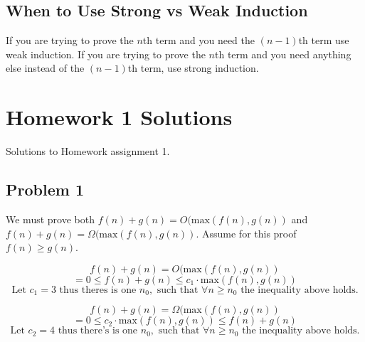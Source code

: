 \documentclass{article}
\begin{document}
\subsection{When to Use Strong vs Weak Induction}

If you are trying to prove the $n$th term and you need the $(n-1)$th term use weak induction. If you are trying to prove the $n$th term and you need anything else instead of the $(n-1)$th term, use strong induction.

\section{Homework 1 Solutions}

Solutions to Homework assignment 1.

\subsection{Problem 1}

We must prove both $f(n) + g(n) = O(\text{max}(f(n),g(n))$ and $f(n) + g(n) = \Omega(\text{max}(f(n),g(n))$. Assume for this proof $f(n) \ge g(n)$.

$$f(n) + g(n) = O(\text{max}(f(n),g(n))$$
$$= 0 \le f(n) + g(n) \le c_1 \cdot \text{max}(f(n),g(n))$$
$$\text{Let } c_1 = 3 \text{ thus theres is one } n_0, \text{ such that } \forall n \ge n_0 \text{ the inequality above holds.}$$

$$f(n) + g(n) = \Omega(\text{max}(f(n),g(n))$$
$$= 0 \le c_2 \cdot \text{max}(f(n),g(n)) \le f(n) + g(n) $$
$$\text{Let } c_2 = 4 \text{ thus there's is one } n_0, \text{ such that } \forall n \ge n_0 \text{ the inequality above holds.}$$
\end{document}
